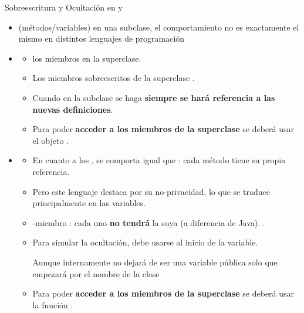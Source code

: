 \documentclass[10pt,envcountsect,spanish]{beamer}
\begin{document}



\begin{frame}{Sobreescritura y Ocultación en  y } 

\begin{itemize}
\item {} (métodos/variables) en una subclase, el comportamiento no es exactamente el mismo en distintos lenguajes de programación

\item {}
\begin{itemize}
\item {} los miembros en la superclase.
\item Los miembros sobreescritos de la superclase  .
\item Cuando en la subclase se haga  \textbf{siempre se hará referencia a las nuevas definiciones}.
\item Para poder \textbf{acceder a los miembros de la superclase} se deberá  usar el objeto .
\end{itemize}

\item {}
\begin{itemize}
\item En cuanto a los , se comporta igual que : cada método tiene su propia referencia.
\item Pero este lenguaje destaca por su no-privacidad, lo que se traduce principalmente en las variables.
\item {}-miembro : cada uno \textbf{no tendrá} la suya (a diferencia de Java). .


\item Para simular la ocultación, debe usarse \cm[red]{\_\_} al inicio de la variable.

Aunque internamente no dejará de ser una variable pública solo que empezará por el nombre de la clase

\item Para poder \textbf{acceder a los miembros de la superclase} se deberá  usar la función .
\end{itemize}

\end{itemize}
\end{frame}
\end{document}
